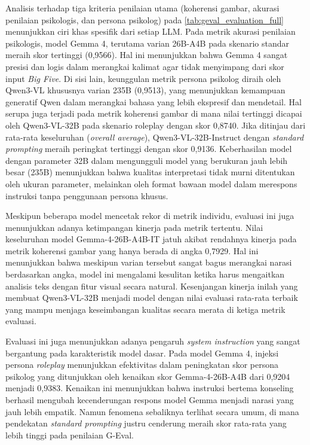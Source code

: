 Analisis terhadap tiga kriteria penilaian utama (koherensi gambar, akurasi penilaian psikologis, dan persona psikolog) pada \autoref{tab:geval_evaluation_full} menunjukkan ciri khas spesifik dari setiap LLM. Pada metrik akurasi penilaian psikologis, model Gemma 4, terutama varian 26B-A4B pada skenario standar meraih skor tertinggi (0,9566). Hal ini menunjukkan bahwa Gemma 4 sangat presisi dan logis dalam merangkai kalimat agar tidak menyimpang dari skor input \textit{Big Five}. Di sisi lain, keunggulan metrik persona psikolog diraih oleh Qwen3-VL khususnya varian 235B (0,9513), yang menunjukkan kemampuan generatif Qwen dalam merangkai bahasa yang lebih ekspresif dan mendetail. Hal serupa juga terjadi pada metrik koherensi gambar di mana nilai tertinggi dicapai oleh Qwen3-VL-32B pada skenario roleplay dengan skor 0,8740. Jika ditinjau dari rata-rata keseluruhan (\textit{overall average}), Qwen3-VL-32B-Instruct dengan \textit{standard prompting} meraih peringkat tertinggi dengan skor 0,9136. Keberhasilan model dengan parameter 32B dalam mengungguli model yang berukuran jauh lebih besar (235B) menunjukkan bahwa kualitas interpretasi tidak murni ditentukan oleh ukuran parameter, melainkan oleh format bawaan model dalam merespons instruksi tanpa penggunaan persona khusus.

Meskipun beberapa model mencetak rekor di metrik individu, evaluasi ini juga menunjukkan adanya ketimpangan kinerja pada metrik tertentu. Nilai keseluruhan model Gemma-4-26B-A4B-IT jatuh akibat rendahnya kinerja pada metrik koherensi gambar yang hanya berada di angka 0,7929. Hal ini menunjukkan bahwa meskipun varian tersebut sangat bagus merangkai narasi berdasarkan angka, model ini mengalami kesulitan ketika harus mengaitkan analisis teks dengan fitur visual secara natural. Kesenjangan kinerja inilah yang membuat Qwen3-VL-32B menjadi model dengan nilai evaluasi rata-rata terbaik yang mampu menjaga keseimbangan kualitas secara merata di ketiga metrik evaluasi.

Evaluasi ini juga menunjukkan adanya pengaruh \textit{system instruction} yang sangat bergantung pada karakteristik model dasar. Pada model Gemma 4, injeksi persona \textit{roleplay} menunjukkan efektivitas dalam peningkatan skor persona psikolog yang ditunjukkan oleh kenaikan skor Gemma-4-26B-A4B dari 0,9204 menjadi 0,9383. Kenaikan ini menunjukkan bahwa instruksi bertema konseling berhasil mengubah kecenderungan respons model Gemma menjadi narasi yang jauh lebih empatik. Namun fenomena sebaliknya terlihat secara umum, di mana pendekatan \textit{standard prompting} justru cenderung meraih skor rata-rata yang lebih tinggi pada penilaian G-Eval.

